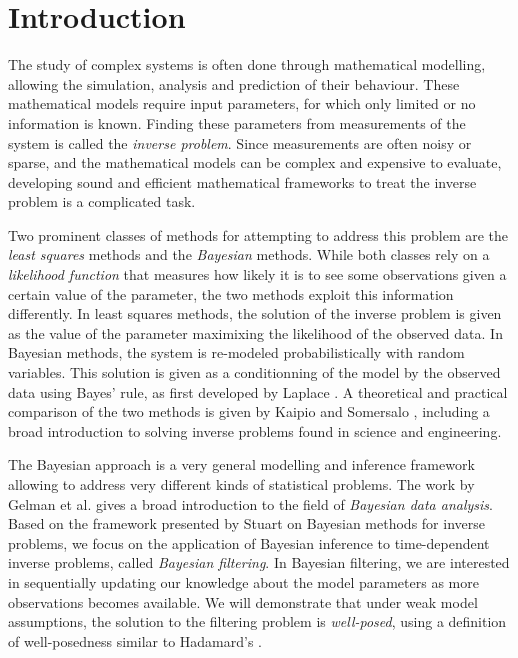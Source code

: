 \section{Introduction}
\setcounter{page}{1}
\thispagestyle{empty}

The study of complex systems is often done through mathematical modelling, allowing the simulation, analysis and prediction of their behaviour. These mathematical models require input parameters, for which only limited or no information is known. Finding these parameters from measurements of the system is called the \textit{inverse problem}. Since measurements are often noisy or sparse, and the mathematical models can be complex and expensive to evaluate, developing sound and efficient mathematical frameworks to treat the inverse problem is a complicated task.

Two prominent classes of methods for attempting to address this problem are the \textit{least squares} methods and the \textit{Bayesian} methods. While both classes rely on a \textit{likelihood function} that measures how likely it is to see some observations given a certain value of the parameter, the two methods exploit this information differently. In least squares methods, the solution of the inverse problem is given as the value of the parameter maximixing the likelihood of the observed data. In Bayesian methods, the system is re-modeled probabilistically with random variables. This solution is given as a conditionning of the model by the observed data using Bayes' rule, as first developed by Laplace \cite{laplace1820theorie}. A theoretical and practical comparison of the two methods is given by Kaipio and Somersalo \cite{kaipio2006statistical}, including a broad introduction to solving inverse problems found in science and engineering. 

The Bayesian approach is a very general modelling and inference framework allowing to address very different kinds of statistical problems. The work by Gelman et al. \cite{gelman} gives a broad introduction to the field of \textit{Bayesian data analysis}. Based on the framework presented by Stuart \cite{stuart_2010} on Bayesian methods for inverse problems, we focus on the application of Bayesian inference to time-dependent inverse problems, called \textit{Bayesian filtering}. In Bayesian filtering, we are interested in sequentially updating our knowledge about the model parameters as more observations becomes available. We will demonstrate that under weak model assumptions, the solution to the filtering problem is \textit{well-posed}, using a definition of well-posedness similar to Hadamard's \cite{hadamard}.

